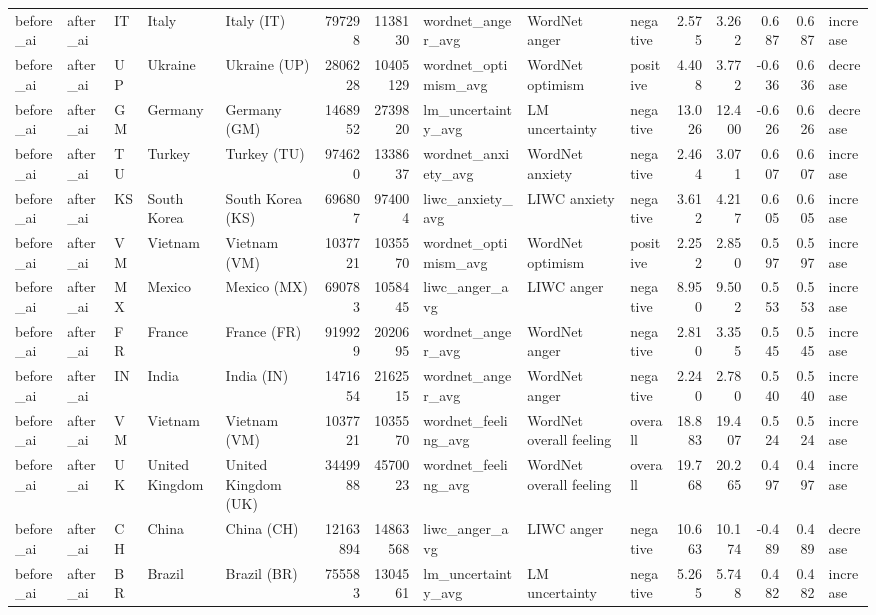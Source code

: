 \begin{tabular}{lllllrrlllrrrrl}
before\_ai & after\_ai & IT & Italy & Italy (IT) & 797298 & 1138130 & wordnet\_anger\_avg & WordNet anger & negative & 2.575 & 3.262 & 0.687 & 0.687 & increase \\
before\_ai & after\_ai & UP & Ukraine & Ukraine (UP) & 2806228 & 10405129 & wordnet\_optimism\_avg & WordNet optimism & positive & 4.408 & 3.772 & -0.636 & 0.636 & decrease \\
before\_ai & after\_ai & GM & Germany & Germany (GM) & 1468952 & 2739820 & lm\_uncertainty\_avg & LM uncertainty & negative & 13.026 & 12.400 & -0.626 & 0.626 & decrease \\
before\_ai & after\_ai & TU & Turkey & Turkey (TU) & 974620 & 1338637 & wordnet\_anxiety\_avg & WordNet anxiety & negative & 2.464 & 3.071 & 0.607 & 0.607 & increase \\
before\_ai & after\_ai & KS & South Korea & South Korea (KS) & 696807 & 974004 & liwc\_anxiety\_avg & LIWC anxiety & negative & 3.612 & 4.217 & 0.605 & 0.605 & increase \\
before\_ai & after\_ai & VM & Vietnam & Vietnam (VM) & 1037721 & 1035570 & wordnet\_optimism\_avg & WordNet optimism & positive & 2.252 & 2.850 & 0.597 & 0.597 & increase \\
before\_ai & after\_ai & MX & Mexico & Mexico (MX) & 690783 & 1058445 & liwc\_anger\_avg & LIWC anger & negative & 8.950 & 9.502 & 0.553 & 0.553 & increase \\
before\_ai & after\_ai & FR & France & France (FR) & 919929 & 2020695 & wordnet\_anger\_avg & WordNet anger & negative & 2.810 & 3.355 & 0.545 & 0.545 & increase \\
before\_ai & after\_ai & IN & India & India (IN) & 1471654 & 2162515 & wordnet\_anger\_avg & WordNet anger & negative & 2.240 & 2.780 & 0.540 & 0.540 & increase \\
before\_ai & after\_ai & VM & Vietnam & Vietnam (VM) & 1037721 & 1035570 & wordnet\_feeling\_avg & WordNet overall feeling & overall & 18.883 & 19.407 & 0.524 & 0.524 & increase \\
before\_ai & after\_ai & UK & United Kingdom & United Kingdom (UK) & 3449988 & 4570023 & wordnet\_feeling\_avg & WordNet overall feeling & overall & 19.768 & 20.265 & 0.497 & 0.497 & increase \\
before\_ai & after\_ai & CH & China & China (CH) & 12163894 & 14863568 & liwc\_anger\_avg & LIWC anger & negative & 10.663 & 10.174 & -0.489 & 0.489 & decrease \\
before\_ai & after\_ai & BR & Brazil & Brazil (BR) & 755583 & 1304561 & lm\_uncertainty\_avg & LM uncertainty & negative & 5.265 & 5.748 & 0.482 & 0.482 & increase \\

\end{tabular}
